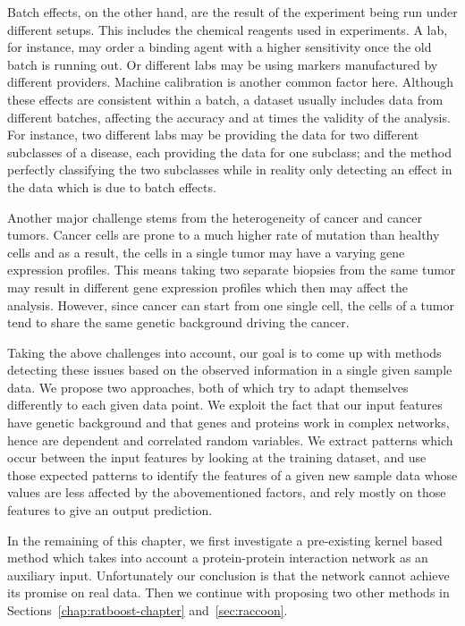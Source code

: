Batch effects, on the other hand, are the result of the experiment being run under different setups. This includes the chemical reagents used in experiments. A lab, for instance, may order a binding agent with a higher sensitivity once the old batch is running out. Or different labs may be using markers manufactured by different providers. Machine calibration is another common factor here. Although these effects are consistent within a batch, a dataset usually includes data from different batches, affecting the accuracy and at times the validity of the analysis. For instance, two different labs may be providing the data for two different subclasses of a disease, each providing the data for one subclass; and the method perfectly classifying the two subclasses while in reality only detecting an effect in the data which is due to batch effects.

Another major challenge stems from the heterogeneity of cancer and cancer tumors. Cancer cells are prone to a much higher rate of mutation than healthy cells and as a result, the cells in a single tumor may have a varying gene expression profiles. This means taking two separate biopsies from the same tumor may result in different gene expression profiles which then may affect the analysis. However, since cancer can start from one single cell, the cells of a tumor tend to share the same genetic background driving the cancer.

Taking the above challenges into account, our goal is to come up with methods detecting these issues based on the observed information in a single given sample data. We propose two approaches, both of which try to adapt themselves differently to each given data point. We exploit the fact that our input features have genetic background and that genes and proteins work in complex networks, hence are dependent and correlated random variables. We extract patterns which occur between the input features by looking at the training dataset, and use those expected patterns to identify the features of a given new sample data whose values are less affected by the abovementioned factors, and rely mostly on those features to give an output prediction.

In the remaining of this chapter, we first investigate a pre-existing kernel based method which takes into account a protein-protein interaction network as an auxiliary input. Unfortunately our conclusion is that the network cannot achieve its promise on real data. Then we continue with proposing two other methods in Sections~\ref{chap:ratboost-chapter} and~\ref{sec:raccoon}.

